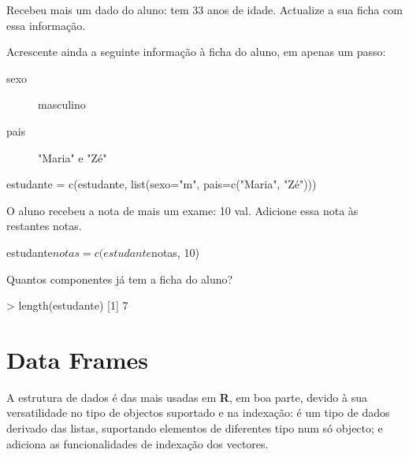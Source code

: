 \documentclass{exam}
\begin{document}
\begin{questions}
\question Recebeu mais um dado do aluno: tem 33 anos de idade. Actualize a sua ficha com essa informação.

\begin{solution}
\end{solution}


\question Acrescente ainda a seguinte informação à ficha do aluno, em apenas um passo:

\begin{description}
\item[sexo] masculino
\item[pais] "Maria" e "Zé"
\end{description}

\begin{solution}
	\begin{rcode}
		estudante = c(estudante, list(sexo="m", pais=c("Maria", "Zé")))
	\end{rcode}
\end{solution}

\question O aluno recebeu a nota de mais um exame: 10 val. Adicione essa nota às restantes notas.

\begin{solution}
	\begin{rcode}
		estudante$notas = c(estudante$notas, 10)
	\end{rcode}
\end{solution}

\question Quantos componentes já tem a ficha do aluno?

\begin{solution}
	\begin{rcode}
		> length(estudante)
		[1] 7
	\end{rcode}
\end{solution}

\end{questions}

\section{Data Frames}

A estrutura de dados  é das mais usadas em \textbf{R}, em boa parte, devido à sua versatilidade no tipo de objectos suportado e na indexação: é um tipo de dados derivado das listas, suportando elementos de diferentes tipo num só objecto; e adiciona as funcionalidades de indexação dos vectores. 
\end{document}
